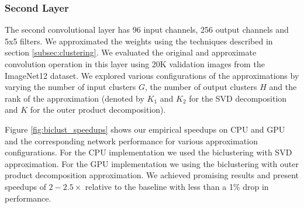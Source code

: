 \subsubsection{Second Layer}
The second convolutional layer has 96 input channels, 256 output channels and 5x5 filters. 
We approximated the weights using the techniques described in section \ref{subsec:clustering}. 
We evaluated the original and approximate convolution operation in
this layer using 20K validation images from the ImageNet12 dataset. 
We explored various configurations of the approximations by varying the number of input clusters $G$, the number of output clusters $H$ and the rank of the approximation (denoted by $K_1$ and $K_2$ for the SVD decomposition and $K$ for the outer product decomposition). 


Figure \ref{fig:biclust_speedups} shows our empirical speedups on CPU
and GPU and the corresponding network performance for
various approximation configurations. For the CPU implementation we used the biclustering with SVD approximation. For the GPU implementation we using the biclustering with outer product decomposition approximation.  
We achieved promising results and present speedups of $2-2.5\times$ relative to the baseline with less than a 1\% drop in performance.

